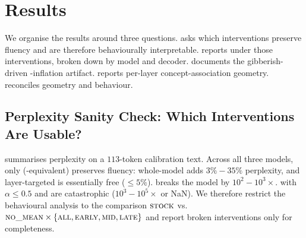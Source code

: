 \section{Results}
\label{sec:results}

We organise the results around three questions.
 asks which interventions preserve fluency and are
therefore behaviourally interpretable.  reports
\dat under those interventions, broken down by model and decoder.
 documents the gibberish-driven \dat-inflation
artifact.  reports per-layer concept-association
geometry.  reconciles geometry and behaviour.

\subsection{Perplexity Sanity Check: Which Interventions Are Usable?}
\label{sec:results:ppl}

 summarises perplexity on a $113$-token calibration text.
Across all three models, only \nomean (\rmsnorm-equivalent) preserves
fluency: whole-model \nomean adds $3\%\!-\!35\%$ perplexity, and
layer-targeted \nomean is essentially free ($\le 5\%$). \noaffine breaks
the model by $10^{2}\!-\!10^{3}\times$. \weakened with $\alpha\le 0.5$ and
\identityln are catastrophic ($10^{3}\!-\!10^{5}\times$ or NaN). We
therefore restrict the behavioural analysis to the comparison
$\textsc{stock}$ vs.\ $\textsc{no\_mean}\times\{\textsc{all},\textsc{early},\textsc{mid},\textsc{late}\}$ and
report broken interventions only for completeness.

